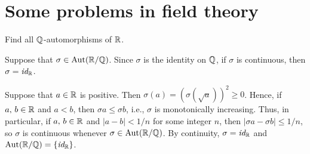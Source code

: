 \section{Some problems in field theory}

\begin{prob}
    Find all ${\mathbb{Q}}$-automorphisms of ${\mathbb{R}}$.
\end{prob}
\begin{sol}
    Suppose that $\sigma\in{\textrm{Aut}({{\mathbb{R}}/{\mathbb{Q}}})}$.
    Since $\sigma$ is the identity on ${\mathbb{Q}}$, if $\sigma$ is continuous, then $\sigma=\textit{id}_{{\mathbb{R}}}$.

    Suppose that $a\in{\mathbb{R}}$ is positive.
    Then $\sigma(a)=(\sigma(\sqrt{a}))^2\geq 0$.
    Hence, if $a,\, b\in{\mathbb{R}}$ and $a<b$, then $\sigma a\leq\sigma b$, i.e., $\sigma$ is monotonically increasing.
    Thus, in particular, if $a,\, b\in{\mathbb{R}}$ and $|a-b|<1/n$ for some integer $n$, then $|\sigma a-\sigma b|\leq 1/n$, so $\sigma$ is continuous whenever $\sigma\in{\textrm{Aut}({{\mathbb{R}}/{\mathbb{Q}}})}$.
    By continuity, $\sigma=\textit{id}_{{\mathbb{R}}}$ and ${\textrm{Aut}({{\mathbb{R}}/{\mathbb{Q}}})}=\{\textit{id}_{{\mathbb{R}}}\}$.
\end{sol}